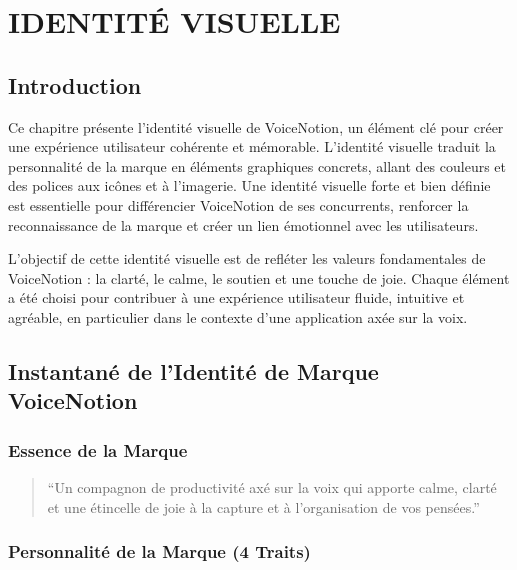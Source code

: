 \chapter{IDENTITÉ VISUELLE}

\section{Introduction}

Ce chapitre présente l'identité visuelle de VoiceNotion, un élément clé pour créer une expérience utilisateur cohérente et mémorable. L'identité visuelle traduit la personnalité de la marque en éléments graphiques concrets, allant des couleurs et des polices aux icônes et à l'imagerie. Une identité visuelle forte et bien définie est essentielle pour différencier VoiceNotion de ses concurrents, renforcer la reconnaissance de la marque et créer un lien émotionnel avec les utilisateurs.

L'objectif de cette identité visuelle est de refléter les valeurs fondamentales de VoiceNotion : la clarté, le calme, le soutien et une touche de joie. Chaque élément a été choisi pour contribuer à une expérience utilisateur fluide, intuitive et agréable, en particulier dans le contexte d'une application axée sur la voix.

\section{Instantané de l'Identité de Marque VoiceNotion}

\subsection{Essence de la Marque}

\begin{quote}
    “Un compagnon de productivité axé sur la voix qui apporte calme, clarté et une étincelle de joie à la capture et à l'organisation de vos pensées.”
\end{quote}

\subsection{Personnalité de la Marque (4 Traits)}

